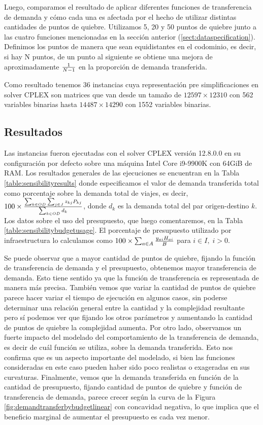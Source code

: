 Luego, comparamos el resultado de aplicar diferentes funciones de transferencia de demanda y cómo cada una es afectada por el hecho de utilizar distintas cantidades de puntos de quiebre. Utilizamos 5, 20 y 50 puntos de quiebre junto a las cuatro funciones mencionadas en la sección anterior (\ref{sect:dataspecification}). Definimos los puntos de manera que sean equidistantes en el codominio, es decir, si hay N puntos, de un punto al siguiente se obtiene una mejora de aproximadamente ${1 \over N - 1}$ en la proporción de demanda transferida.

Como resultado tenemos 36 instancias cuya representación pre simplificaciones en solver CPLEX son matrices que van desde un tamaño de $12597 \times 12310$ con 562 variables binarias hasta $14487 \times 14290$ con 1552 variables binarias.

\clearpage
\subsection{Resultados}

Las instancias fueron ejecutadas con el solver CPLEX versión 12.8.0.0 en su configuración por defecto sobre una máquina Intel Core i9-9900K con 64GiB de RAM. Los resultados generales de las ejecuciones se encuentran en la Tabla \ref{table:sensibilityresults} donde especificamos el valor de demanda transferida total como porcentaje sobre la demanda total de viajes, es decir, $100 \times {\sum_{k \in OD} \sum_{j \in J} z_{kj} P_{kj} \over \sum_{k \in OD} d_k}$, donde $d_k$ es la demanda total del par origen-destino $k$. Los datos sobre el uso del presupuesto, que luego comentaremos, en la Tabla \ref{table:sensibilitybudgetusage}. El porcentaje de presupuesto utilizado por infraestructura lo calculamos como $100 \times \sum_{a \in A} {y_{ai} H_{ai} \over B}$ para $i \in I,\; i > 0$.

Se puede observar que a mayor cantidad de puntos de quiebre, fijando la función de transferencia de demanda y el presupuesto, obtenemos mayor transferencia de demanda. Esto tiene sentido ya que la función de transferencia es representada de manera más precisa. También vemos que variar la cantidad de puntos de quiebre parece hacer variar el tiempo de ejecución en algunos casos, sin poderse determinar una relación general entre la cantidad y la complejidad resultante pero sí podemos ver que fijando los otros parámetros y aumentando la cantidad de puntos de quiebre la complejidad aumenta. Por otro lado, observamos un fuerte impacto del modelado del comportamiento de la transferencia de demanda, es decir de cuál función se utiliza, sobre la demanda transferida. Esto nos confirma que es un aspecto importante del modelado, si bien las funciones consideradas en este caso pueden haber sido poco realistas o exageradas en sus curvaturas. Finalmente, vemos que la demanda transferida en función de la cantidad de presupuesto, fijando cantidad de puntos de quiebre y función de transferencia de demanda, parece crecer según la curva de la Figura \ref{fig:demandtransferbybudgetlinear} con concavidad negativa, lo que implica que el beneficio marginal de aumentar el presupuesto es cada vez menor.

